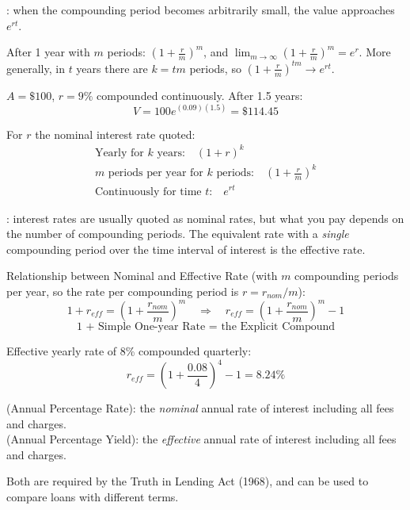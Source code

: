 \begin{definition}
    : when the compounding period becomes arbitrarily small, the value approaches $e^{rt}$.
\end{definition}
After 1 year with $m$ periods: $(1+\frac{r}{m})^m$, and $\lim_{m\to\infty}(1+\frac{r}{m})^m = e^r$. More generally, in $t$ years there are $k = tm$ periods, so $(1+\frac{r}{m})^{tm} \to e^{rt}$.

\begin{example}
    $A = \$100$, $r = 9\%$ compounded continuously. After 1.5 years:
    \[V = 100e^{(0.09)(1.5)} = \$114.45\]
\end{example}

For $r$ the nominal interest rate quoted:
\[\boxed{\begin{gathered}
    \text{Yearly for $k$ years:} \quad (1+r)^k\\
    \text{$m$ periods per year for $k$ periods:} \quad \left(1+\frac{r}{m}\right)^k\\
    \text{Continuously for time $t$:} \quad e^{rt}
\end{gathered}}\]

\begin{definition}
    : interest rates are usually quoted as nominal rates, but what you pay depends on the number of compounding periods. The equivalent rate with a \textit{single} compounding period over the time interval of interest is the effective rate.
\end{definition}

Relationship between Nominal and Effective Rate (with $m$ compounding periods per year, so the rate per compounding period is $r = r_{nom}/m$):
\[1+ r_{eff} = (1+ \frac{r_{nom}}{m})^m \quad \Rightarrow \quad \boxed{r_{eff} = (1+ \frac{r_{nom}}{m})^m - 1}\]
\[\text{1 + Simple One-year Rate = the Explicit Compound}\]

\begin{example}
    Effective yearly rate of 8\% compounded quarterly:
    \[r_{eff} = \left(1+\frac{0.08}{4}\right)^4 - 1 = 8.24\%\]
\end{example}

\begin{definition}
     (Annual Percentage Rate): the \textit{nominal} annual rate of interest including all fees and charges.
    \\ (Annual Percentage Yield): the \textit{effective} annual rate of interest including all fees and charges.
\end{definition}
Both are required by the Truth in Lending Act (1968), and can be used to compare loans with different terms.


